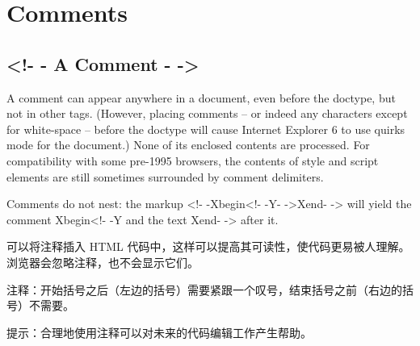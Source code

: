 \chapter{Comments}


\section{<!- - A Comment - ->}

A comment can appear anywhere in a document, even before the doctype, but not in other tags. (However, placing comments – or indeed any characters except for white-space – before the doctype will cause Internet Explorer 6 to use quirks mode for the document.) None of its enclosed contents are processed. For compatibility with some pre-1995 browsers, the contents of style and script elements are still sometimes surrounded by comment delimiters.

Comments do not nest: the markup <!- -Xbegin<!- -Y- ->Xend- -> will yield the comment Xbegin<!- -Y and the text Xend- -> after it.

可以将注释插入 HTML 代码中，这样可以提高其可读性，使代码更易被人理解。浏览器会忽略注释，也不会显示它们。

注释：开始括号之后（左边的括号）需要紧跟一个叹号，结束括号之前（右边的括号）不需要。

提示：合理地使用注释可以对未来的代码编辑工作产生帮助。


































